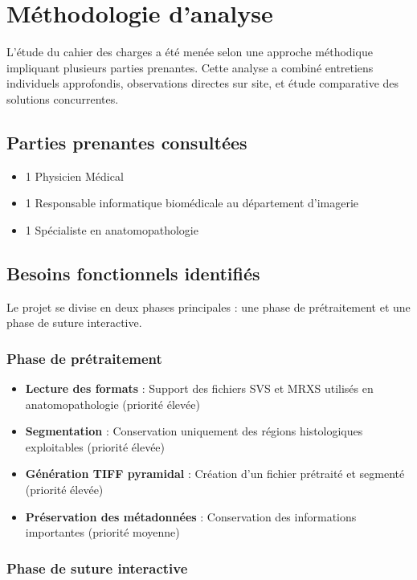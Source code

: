 \documentclass[11pt,a4paper]{report}
\begin{document}
\section{Méthodologie d'analyse}

L'étude du cahier des charges a été menée selon une approche méthodique impliquant plusieurs parties prenantes. Cette analyse a combiné entretiens individuels approfondis, observations directes sur site, et étude comparative des solutions concurrentes.

\subsection{Parties prenantes consultées}

\begin{itemize}
\item 1 Physicien Médical
\item 1 Responsable informatique biomédicale au département d'imagerie
\item 1 Spécialiste en anatomopathologie
\end{itemize}

\subsection{Besoins fonctionnels identifiés}

Le projet se divise en deux phases principales : une phase de prétraitement et une phase de suture interactive.

\subsubsection{Phase de prétraitement}

\begin{itemize}
\item \textbf{Lecture des formats} : Support des fichiers SVS et MRXS utilisés en anatomopathologie (priorité élevée)
\item \textbf{Segmentation} : Conservation uniquement des régions histologiques exploitables (priorité élevée)
\item \textbf{Génération TIFF pyramidal} : Création d'un fichier prétraité et segmenté (priorité élevée)
\item \textbf{Préservation des métadonnées} : Conservation des informations importantes (priorité moyenne)
\end{itemize}

\subsubsection{Phase de suture interactive}
\end{document}

